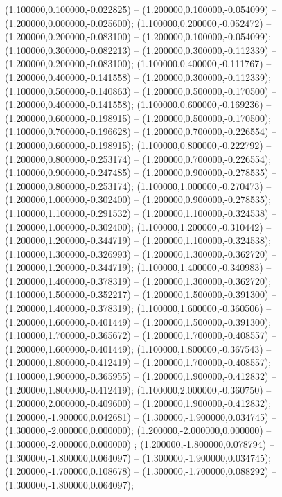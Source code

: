  (1.100000,0.100000,-0.022825) -- (1.200000,0.100000,-0.054099) -- (1.200000,0.000000,-0.025600);
 (1.100000,0.200000,-0.052472) -- (1.200000,0.200000,-0.083100) -- (1.200000,0.100000,-0.054099);
 (1.100000,0.300000,-0.082213) -- (1.200000,0.300000,-0.112339) -- (1.200000,0.200000,-0.083100);
 (1.100000,0.400000,-0.111767) -- (1.200000,0.400000,-0.141558) -- (1.200000,0.300000,-0.112339);
 (1.100000,0.500000,-0.140863) -- (1.200000,0.500000,-0.170500) -- (1.200000,0.400000,-0.141558);
 (1.100000,0.600000,-0.169236) -- (1.200000,0.600000,-0.198915) -- (1.200000,0.500000,-0.170500);
 (1.100000,0.700000,-0.196628) -- (1.200000,0.700000,-0.226554) -- (1.200000,0.600000,-0.198915);
 (1.100000,0.800000,-0.222792) -- (1.200000,0.800000,-0.253174) -- (1.200000,0.700000,-0.226554);
 (1.100000,0.900000,-0.247485) -- (1.200000,0.900000,-0.278535) -- (1.200000,0.800000,-0.253174);
 (1.100000,1.000000,-0.270473) -- (1.200000,1.000000,-0.302400) -- (1.200000,0.900000,-0.278535);
 (1.100000,1.100000,-0.291532) -- (1.200000,1.100000,-0.324538) -- (1.200000,1.000000,-0.302400);
 (1.100000,1.200000,-0.310442) -- (1.200000,1.200000,-0.344719) -- (1.200000,1.100000,-0.324538);
 (1.100000,1.300000,-0.326993) -- (1.200000,1.300000,-0.362720) -- (1.200000,1.200000,-0.344719);
 (1.100000,1.400000,-0.340983) -- (1.200000,1.400000,-0.378319) -- (1.200000,1.300000,-0.362720);
 (1.100000,1.500000,-0.352217) -- (1.200000,1.500000,-0.391300) -- (1.200000,1.400000,-0.378319);
 (1.100000,1.600000,-0.360506) -- (1.200000,1.600000,-0.401449) -- (1.200000,1.500000,-0.391300);
 (1.100000,1.700000,-0.365672) -- (1.200000,1.700000,-0.408557) -- (1.200000,1.600000,-0.401449);
 (1.100000,1.800000,-0.367543) -- (1.200000,1.800000,-0.412419) -- (1.200000,1.700000,-0.408557);
 (1.100000,1.900000,-0.365955) -- (1.200000,1.900000,-0.412832) -- (1.200000,1.800000,-0.412419);
 (1.100000,2.000000,-0.360750) -- (1.200000,2.000000,-0.409600) -- (1.200000,1.900000,-0.412832);
 (1.200000,-1.900000,0.042681) -- (1.300000,-1.900000,0.034745) -- (1.300000,-2.000000,0.000000);
 (1.200000,-2.000000,0.000000) -- (1.300000,-2.000000,0.000000) ;
 (1.200000,-1.800000,0.078794) -- (1.300000,-1.800000,0.064097) -- (1.300000,-1.900000,0.034745);
 (1.200000,-1.700000,0.108678) -- (1.300000,-1.700000,0.088292) -- (1.300000,-1.800000,0.064097);
